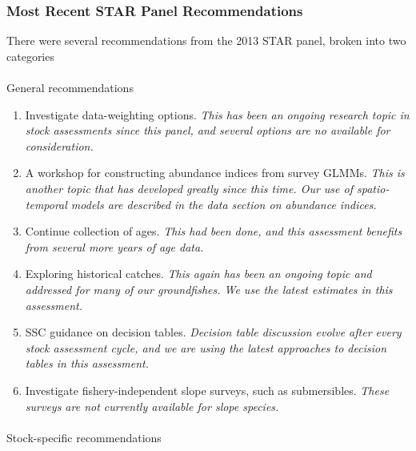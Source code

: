 \documentclass[
]{scrartcl}
\makeatletter
\let\oldparagraph\paragraph
\renewcommand{\paragraph}{
    \@ifstar
      \xxxParagraphStar
      \xxxParagraphNoStar
  }
\newcommand{\xxxParagraphStar}[1]{\oldparagraph*{#1}\mbox{}}
\newcommand{\xxxParagraphNoStar}[1]{\oldparagraph{#1}\mbox{}}
\providecommand{\tightlist}{%
  \setlength{\itemsep}{0pt}\setlength{\parskip}{0pt}}\usepackage{longtable,booktabs,array}
\makeatother
\begin{document}
\subsubsection{Most Recent STAR Panel
Recommendations}\label{most-recent-star-panel-recommendations}

There were several recommendations from the 2013 STAR panel, broken into
two categories

\paragraph{General recommendations}\label{general-recommendations}

\begin{enumerate}
\def\labelenumi{\arabic{enumi}.}
\tightlist
\item
  Investigate data-weighting options. \emph{This has been an ongoing
  research topic in stock assessments since this panel, and several
  options are no available for consideration.}
\item
  A workshop for constructing abundance indices from survey GLMMs.
  \emph{This is another topic that has developed greatly since this
  time. Our use of spatio-temporal models are described in the data
  section on abundance indices.}
\item
  Continue collection of ages. \emph{This had been done, and this
  assessment benefits from several more years of age data.}
\item
  Exploring historical catches. \emph{This again has been an ongoing
  topic and addressed for many of our groundfishes. We use the latest
  estimates in this assessment.}
\item
  SSC guidance on decision tables. \emph{Decision table discussion
  evolve after every stock assessment cycle, and we are using the latest
  approaches to decision tables in this assessment.}
\item
  Investigate fishery-independent slope surveys, such as submersibles.
  \emph{These surveys are not currently available for slope species.}
\end{enumerate}

\paragraph{Stock-specific
recommendations}\label{stock-specific-recommendations}
\end{document}
